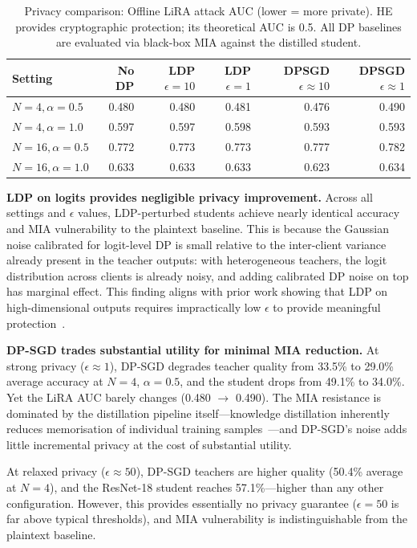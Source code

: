 \begin{table}[h]
\centering
\caption{Privacy comparison: Offline LiRA attack AUC (lower = more private). HE provides cryptographic protection; its theoretical AUC is 0.5. All DP baselines are evaluated via black-box MIA against the distilled student.}
\label{tab:dp_privacy}
\begin{tabular}{l|r|r|r|r|r}
\hline
\textbf{Setting} & \textbf{No DP} & \textbf{LDP} $\epsilon{=}10$ & \textbf{LDP} $\epsilon{=}1$ & \textbf{DPSGD} $\epsilon{\approx}10$ & \textbf{DPSGD} $\epsilon{\approx}1$ \\
\hline
$N{=}4, \alpha{=}0.5$  & 0.480 & 0.480 & 0.481 & 0.476 & 0.490 \\
$N{=}4, \alpha{=}1.0$  & 0.597 & 0.597 & 0.598 & 0.593 & 0.593 \\
$N{=}16, \alpha{=}0.5$ & 0.772 & 0.773 & 0.773 & 0.777 & 0.782 \\
$N{=}16, \alpha{=}1.0$ & 0.633 & 0.633 & 0.633 & 0.623 & 0.634 \\
\hline
\end{tabular}
\end{table}
 
\textbf{LDP on logits provides negligible privacy improvement.} Across all settings and $\epsilon$ values, LDP-perturbed students achieve nearly identical accuracy and MIA vulnerability to the plaintext baseline. This is because the Gaussian noise calibrated for logit-level DP is small relative to the inter-client variance already present in the teacher outputs: with heterogeneous teachers, the logit distribution across clients is already noisy, and adding calibrated DP noise on top has marginal effect. This finding aligns with prior work showing that LDP on high-dimensional outputs requires impractically low $\epsilon$ to provide meaningful protection~\cite{wei2020federated}.
 
\textbf{DP-SGD trades substantial utility for minimal MIA reduction.} At strong privacy ($\epsilon \approx 1$), DP-SGD degrades teacher quality from 33.5\% to 29.0\% average accuracy at $N{=}4$, $\alpha{=}0.5$, and the student drops from 49.1\% to 34.0\%. Yet the LiRA AUC barely changes (0.480 $\to$ 0.490). The MIA resistance is dominated by the distillation pipeline itself---knowledge distillation inherently reduces memorisation of individual training samples~\cite{mazzone2022repeated}---and DP-SGD's noise adds little incremental privacy at the cost of substantial utility.
 
At relaxed privacy ($\epsilon \approx 50$), DP-SGD teachers are higher quality (50.4\% average at $N{=}4$), and the ResNet-18 student reaches 57.1\%---higher than any other configuration. However, this provides essentially no privacy guarantee ($\epsilon = 50$ is far above typical thresholds), and MIA vulnerability is indistinguishable from the plaintext baseline.
 

